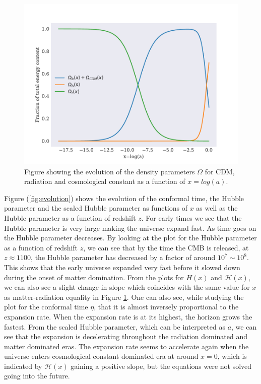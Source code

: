\documentclass[onecolumn]{aastex62}
\begin{document}
\begin{figure}
    \includegraphics[scale=0.8]{figures/densityparams.pdf}
    \caption{Figure showing the evolution of the density parameters $\Omega$ for CDM, radiation and cosmological constant as a function of $x=log(a)$.}
    \label{fig:densityparams}
\end{figure}

Figure (\ref{fig:evolution}) shows the evolution of the conformal time, the
Hubble parameter and the scaled Hubble parameter as functions of $x$ as well as
the Hubble parameter as a function of redshift $z$. For early times we see that
the Hubble parameter is very large making the universe expand fast. As time goes
on the Hubble parameter decreases. By looking at the plot for the Hubble
parameter as a function of redshift $z$, we can see that by the time the CMB is
released, at $z\approx1100$, the Hubble parameter has decreased by a factor of
around $10^7\sim10^8$. This shows that the early universe expanded very fast
before it slowed down during the onset of matter domination. From the
plots for $H(x)$ and $\mathcal{H}(x)$, we can also see a slight change in slope
which coincides with the same value for $x$ as matter-radiation equality in
Figure \ref{fig:densityparams}. One can also see, while studying the plot for
the conformal time $\eta$, that it is almost inversely proportional to the
expansion rate. When the expansion rate is at its highest, the horizon grows the
fastest. From the scaled Hubble parameter, which can be interpreted as
$\dot{a}$, we can see that the expansion is decelerating throughout the
radiation dominated and matter dominated eras. The expansion rate seems to
accelerate again when the universe enters cosmological constant dominated era at
around $x=0$, which is indicated by $\mathcal{H}(x)$ gaining a positive slope,
but the equations were not solved going into the future. 
\end{document}
